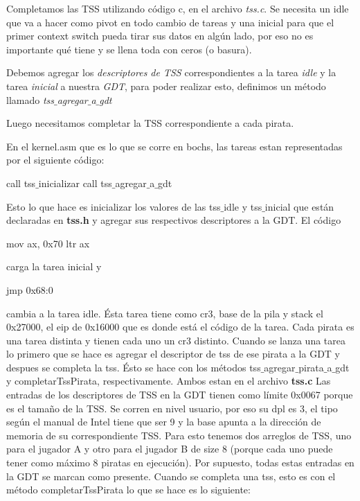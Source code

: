 Completamos las TSS utilizando c\'odigo c, en el archivo \textit{tss.c}. Se necesita un idle que va a hacer como pivot en todo cambio de tareas y una inicial para que el primer context switch pueda tirar sus datos en algún lado, por eso no es importante qué tiene y se llena toda con ceros (o basura).

Debemos agregar los \textit{descriptores de TSS} correspondientes a la tarea \textit{idle} y la tarea \textit{inicial} a nuestra \textit{GDT}, para poder realizar esto, definimos un m\'etodo llamado \textit{tss$\_$agregar$\_$a$\_$gdt}

Luego necesitamos completar la TSS correspondiente a cada pirata.

En el kernel.asm que es lo que se corre en bochs, las tareas estan representadas por el siguiente código:
\begin{algorithmic}
\State call tss$\_$inicializar
\State call tss$\_$agregar$\_$a$\_$gdt
\end{algorithmic}
Esto lo que hace es inicializar los valores de las tss$\_$idle y tss$\_$inicial que están declaradas en \textbf{tss.h} y agregar sus respectivos descriptores a la GDT.
El código
\begin{algorithmic}
\State mov ax, 0x70
\State ltr ax
\end{algorithmic}
carga la tarea inicial y
\begin{algorithmic}
\State jmp 0x68:0
\end{algorithmic}
cambia a la tarea idle.
Ésta tarea tiene como cr3, base de la pila y stack el 0x27000, el eip de 0x16000 que es donde está el código de la tarea.
\newline
\newline
Cada pirata es una tarea distinta y tienen cada uno un cr3 distinto.
Cuando se lanza una tarea lo primero que se hace es agregar el descriptor de tss de ese pirata a la GDT y despues se completa la tss. Ésto se hace con los métodos tss$\_$agregar$\_$pirata$\_$a$\_$gdt y completarTssPirata, respectivamente. Ambos estan en el archivo \textbf{tss.c}
Las entradas de los descriptores de TSS en la GDT tienen como límite 0x0067 porque es el tamaño de la TSS. Se corren en nivel usuario, por eso su dpl es 3, el tipo según el manual de Intel tiene que ser 9 y la base apunta a la dirección de memoria de su correspondiente TSS. Para esto tenemos dos arreglos de TSS, uno para el jugador A y otro para el jugador B de size 8 (porque cada uno puede tener como máximo 8 piratas en ejecución). Por supuesto, todas estas entradas en la GDT se marcan como presente.
Cuando se completa una tss, esto es con el método completarTssPirata lo que se hace es lo siguiente:

